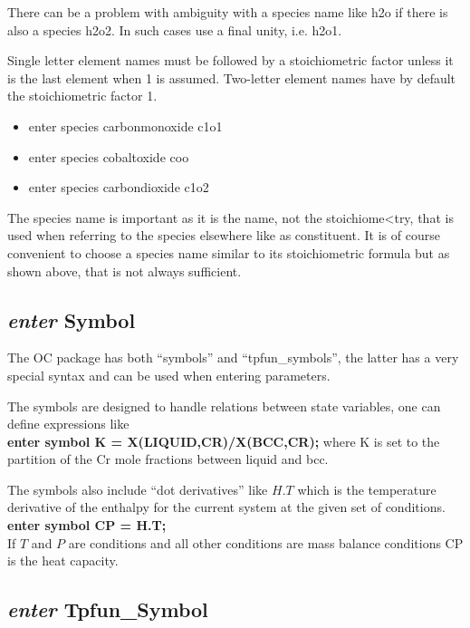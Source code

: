 \documentclass[12pt]{article}
\begin{document}
There can be a problem with ambiguity with a species name like h2o if
there is also a species h2o2.  In such cases use a final unity, i.e.
h2o1.

Single letter element names must be followed by a stoichiometric
factor unless it is the last element when 1 is assumed.  Two-letter
element names have by default the stoichiometric factor 1.

\begin{itemize}
\item enter species carbonmonoxide c1o1
\item enter species cobaltoxide coo
\item enter species carbondioxide c1o2
\end{itemize}

The species name is important as it is the name, not the
stoichiome<try, that is used when referring to the species elsewhere
like as constituent.  It is of course convenient to choose a species
name similar to its stoichiometric formula but as shown above, that is
not always sufficient.

\subsection{{\em enter} Symbol}

The OC package has both ``symbols'' and ``tpfun\_symbols'', the latter
has a very special syntax and can be used when entering parameters.

The symbols are designed to handle relations between state variables,
one can define expressions like \\
{\bf enter symbol K = X(LIQUID,CR)/X(BCC,CR);}
where K is set to the partition of the Cr mole fractions between
liquid and bcc.

The symbols also include ``dot derivatives'' like $H.T$ which is the
temperature derivative of the enthalpy for the current system at the
given set of conditions.  \\
{\bf enter symbol CP = H.T;}\\
If $T$ and $P$ are conditions and all other
conditions are mass balance conditions CP is the heat capacity.

\subsection{{\em enter} Tpfun\_Symbol}
\end{document}
